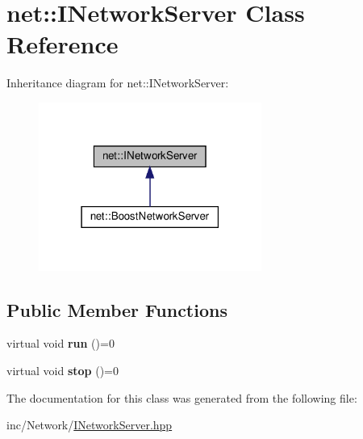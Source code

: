 \hypertarget{classnet_1_1INetworkServer}{}\section{net\+:\+:I\+Network\+Server Class Reference}
\label{classnet_1_1INetworkServer}


Inheritance diagram for net\+:\+:I\+Network\+Server\+:
\nopagebreak
\begin{figure}[H]
\begin{center}
\leavevmode
\includegraphics[width=207pt]{classnet_1_1INetworkServer__inherit__graph}
\end{center}
\end{figure}
\subsection*{Public Member Functions}
\begin{DoxyCompactItemize}
\item 
\mbox{\label{classnet_1_1INetworkServer_a464da336a8084d28324d191823690846}} 
virtual void {\bfseries run} ()=0
\item 
\mbox{\label{classnet_1_1INetworkServer_ab6a49f446a841fbf970862a0a72b174d}} 
virtual void {\bfseries stop} ()=0
\end{DoxyCompactItemize}


The documentation for this class was generated from the following file\+:\begin{DoxyCompactItemize}
\item 
inc/\+Network/\hyperlink{INetworkServer_8hpp}{I\+Network\+Server.\+hpp}\end{DoxyCompactItemize}
